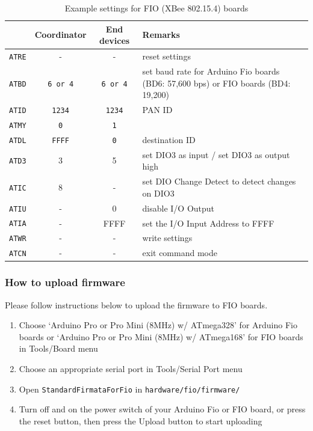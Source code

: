 \documentclass[9pt]{jsarticle}
\begin{document}
\begin{table}[htdp]
\begin{center}
\small
\begin{tabular}{|r|c|c|l|}
\hline   & Coordinator & End devices & Remarks \\\hline
\hline \texttt{ATRE} & - & - & reset settings \\
\hline \texttt{ATBD} & \texttt{6 or 4} & \texttt{6 or 4} & set baud rate for Arduino Fio boards (BD6: 57,600 bps) or FIO boards (BD4: 19,200) \\
\hline \texttt{ATID} & \texttt{1234} & \texttt{1234} & PAN ID \\
\hline \texttt{ATMY} & \texttt{0} & \texttt{1} &  \\
\hline \texttt{ATDL} & \texttt{FFFF} & \texttt{0} & destination ID \\
\hline \texttt{ATD3} & 3 & 5 & set DIO3 as input / set DIO3 as output high \\
\hline \texttt{ATIC} & 8 & - & set DIO Change Detect to detect changes on DIO3 \\
\hline \texttt{ATIU} & - & 0 & disable I/O Output \\
\hline \texttt{ATIA} & - & FFFF & set the I/O Input Address to FFFF \\
\hline \texttt{ATWR} & - & - & write settings \\
\hline \texttt{ATCN} & - & - & exit command mode \\
\hline 
\end{tabular} 
\caption{Example settings for FIO (XBee 802.15.4) boards}
\end{center}
\label{xbee}
\end{table}

\newpage
\subsubsection{How to upload firmware}
\label{uploading_firmata_fio}
Please follow instructions below to upload the firmware to FIO boards.
\begin{enumerate}
\item Choose `Arduino Pro or Pro Mini (8MHz) w/ ATmega328' for Arduino Fio boards or `Arduino Pro or Pro Mini (8MHz) w/ ATmega168' for FIO boards in Tools/Board menu
\item Choose an appropriate serial port in Tools/Serial Port menu
\item Open \texttt{StandardFirmataForFio} in \texttt{hardware/fio/firmware/}
\item Turn off and on the power switch of your Arduino Fio or FIO board, or press the reset button, then press the Upload button to start uploading
\end{enumerate}
\end{document}
